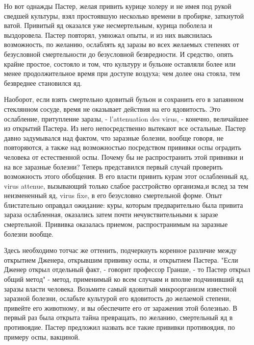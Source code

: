 Но вот однажды Пастер, желая привить  курице холеру и не имея под  рукой
сведшей  культуры,  взял  простоявшую  несколько  времени  в   пробирке,
заткнутой ватой. Привитый яд оказался уже несмертельным, курица поболела
и выздоровела.  Пастер  повторял, умножал  опыты,  и из  них  выяснилась
возможность, по желанию, ослаблять яд  заразы во всех желаемых  степенях
от безусловной смертельности  до безусловной  безвредности. И  средство,
опять крайне простое, состояло и  том, что культуру и бульоне  оставляли
более или менее продолжительное время при доступе воздуха; чем долее она
стояла, тем безвреднее становился яд.

Наоборот, если  взять  смертельно  ядовитый бульон  и  сохранить  его  в
запаянном  стеклянном  сосуде,  время  не  оказывает  действия  на   его
ядовитость. Это  ослабление,  притупление заразы,  -  l'attenuation  des
virus,  -   конечно,   величайшее   из   открытий   Пастера.   Из   него
непосредственно вытекают  все остальные.  Пастер давно  задумывался  над
фактом, что заразные болезни, вообще говоря, не повторяются, а также над
возможностью посредством прививки оспы оградить человека от естественной
оспы. Почему  бы  не распространить  этой  прививки и  на  все  заразные
болезни? Теперь представился первый  случай проверить возможность  этого
обобщения. В  его  власти  привить  курам  этот  ослабленный  яд,  virus
attenue, вызывающий только слабое расстройство организма,и вслед за  тем
неизмененный яд, virus  fixe, в его  безусловно смертельной форме.  Опыт
блистательно  оправдал  ожидание:  куры,  которым  предварительно   была
привита зараза ослабленная,  оказались затем  почти нечувствительными  к
заразе  смертельной.  Прививка  оказалась  приемом,  распространимым  на
заразные болезни вообще.

Здесь необходимо тотчас же оттенить, подчеркнуть коренное различие между
открытием Дженера, открывшим прививку  оспы, и открытием Пастера.  "Если
Дженер открыл отдельный факт,  - говорит профессор  Гранше, - то  Пастер
открыл общий  метод"  -  метод,  применимый ко  всем  случаям  и  вполне
подчинивший  яд  заразы   власти  человека.   Возьмите  самый   ядовитый
микроорганизм  известной  заразной   болезни,  ослабьте  культурой   его
ядовитость до желаемой степени, привейте его животному, и вы  обеспечите
его от  заражения  этой  болезнью.  В  первый  раз  была  открыта  тайна
превращать, по желанию, смертельный  яд в противоядие. Пастер  предложил
назвать все такие прививки противоядия, по примеру оспы, вакциной.

